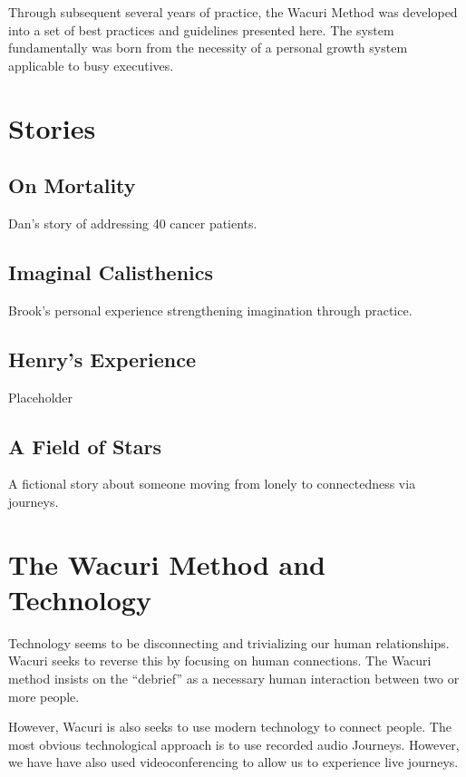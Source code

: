 \documentclass[12pt]{book}
\begin{document}
Through subsequent several years of practice, the Wacuri Method was developed into a set of best practices and guidelines presented here. The system fundamentally was born from the necessity of a personal growth system applicable to busy executives.
				
			
	

\chapter{Stories}

\section{On Mortality}

Dan's story of addressing 40 cancer patients.

\section{Imaginal Calisthenics}

Brook's personal experience strengthening imagination through practice.

\section{Henry's Experience}

Placeholder 

\section{A Field of Stars}

A fictional story about someone moving from lonely to connectedness via journeys.
\chapter{The Wacuri Method and Technology}

Technology seems to be disconnecting and trivializing our human relationships.
Wacuri seeks to reverse this by focusing on human connections. The Wacuri method
insists on the ``debrief'' as a necessary human interaction between two or more people.

However, Wacuri is also seeks to use modern technology to connect people.
The most obvious technological approach is to use recorded audio Journeys.
However, we have have also used videoconferencing to allow us to experience live journeys.
\end{document}
